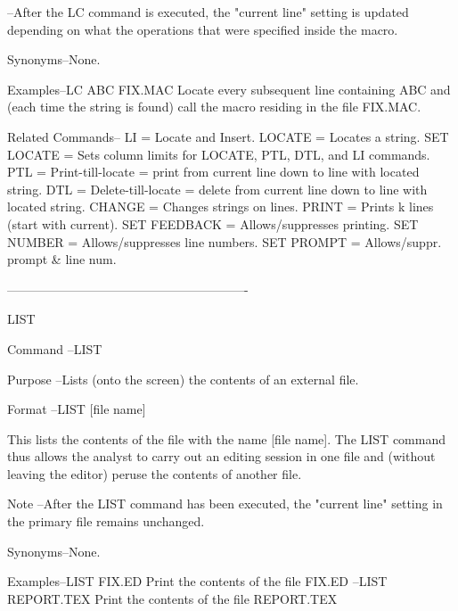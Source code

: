        --After the LC command is executed, the
          "current line" setting is updated
          depending on what the operations
          that were specified inside the macro.
 
Synonyms--None.
 
Examples--LC ABC FIX.MAC       Locate every subsequent
                               line containing ABC and
                               (each time the string is found)
                               call the macro residing
                               in the file   FIX.MAC.
 
Related Commands--
          LI              = Locate and Insert.
          LOCATE          = Locates a string.
          SET LOCATE      = Sets column limits for
                            LOCATE, PTL, DTL, and
                            LI commands.
          PTL             = Print-till-locate =
                            print from current line down
                            to line with located string.
          DTL             = Delete-till-locate =
                            delete from current line down
                            to line with located string.
          CHANGE          = Changes strings on lines.
          PRINT           = Prints k lines (start with current).
          SET FEEDBACK    = Allows/suppresses printing.
          SET NUMBER      = Allows/suppresses line numbers.
          SET PROMPT      = Allows/suppr. prompt & line num.
 
----------------------------------------------------------
 
LIST
 
Command --LIST
 
Purpose --Lists (onto the screen) the
          contents of an external file.
 
Format  --LIST   [file name]
 
          This lists the contents of the file
          with the name   [file name].  The LIST
          command thus allows the analyst to carry
          out an editing session in one file and
          (without leaving the editor) peruse the
          contents of another file.
 
Note    --After the LIST command has been
          executed, the "current line" setting
          in the primary file remains unchanged.
 
Synonyms--None.
 
Examples--LIST FIX.ED         Print the contents
                              of the file FIX.ED
        --LIST REPORT.TEX     Print the contents
                              of the file REPORT.TEX
 
